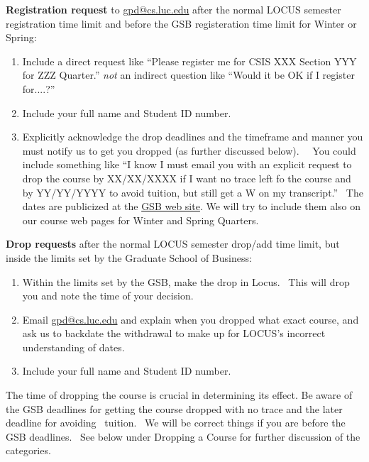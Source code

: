 \documentclass[letterpaper,10pt,english]{sphinxmanual}
\begin{document}
\textbf{Registration request} to \href{mailto:gpd@cs.luc.edu}{gpd@cs.luc.edu} after the normal LOCUS
semester registration time limit and before the GSB registeration time
limit for Winter or Spring:
\begin{enumerate}
\item {} 
Include a direct request like ``Please register me for CSIS XXX
Section YYY for ZZZ Quarter.'' \emph{not} an indirect question like ``Would
it be OK if I register for....?''

\item {} 
Include your full name and Student ID number.

\item {} 
Explicitly acknowledge the drop deadlines and the timeframe and
manner you must notify us to get you dropped (as further discussed
below).   You could include something like ``I know I must email you
with an explicit request to drop the course by XX/XX/XXXX if I want
no trace left fo the course and by YY/YY/YYYY to avoid tuition, but
still get a W on my transcript.''  The dates are publicized at the
\href{http://www.luc.edu/gsb/academics\_calendars.shtml}{GSB web site}.
We will try to include them also on our course web pages for Winter
and Spring Quarters.

\end{enumerate}

\textbf{Drop requests} after the normal LOCUS semester drop/add time limit,
but inside the limits set by the Graduate School of Business:
\begin{enumerate}
\item {} 
Within the limits set by the GSB, make the drop in Locus.  This will
drop you and note the time of your decision.

\item {} 
Email \href{mailto:gpd@cs.luc.edu}{gpd@cs.luc.edu} and explain when you dropped what exact course,
and ask us to backdate the withdrawal to make up for LOCUS's
incorrect understanding of dates.

\item {} 
Include your full name and Student ID number.

\end{enumerate}

The time of dropping the course is crucial in determining its effect.
Be aware of the GSB deadlines for getting the course dropped with no
trace and the later deadline for avoiding  tuition.  We will be correct
things if you are before the GSB deadlines.  See below under Dropping a
Course for further discussion of the categories.
\end{document}

